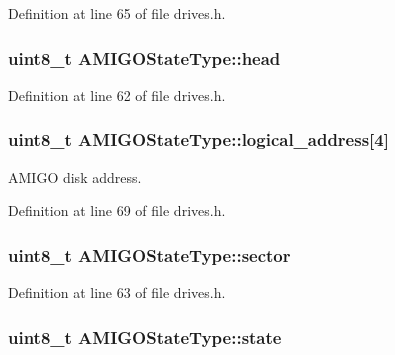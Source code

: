 Definition at line 65 of file drives.\+h.

\subsubsection[{\texorpdfstring{head}{head}}]{\setlength{\rightskip}{0pt plus 5cm}uint8\+\_\+t A\+M\+I\+G\+O\+State\+Type\+::head}\hypertarget{structAMIGOStateType_a92b01a4e3912d2fcacebcc15a21c66c9}{}\label{structAMIGOStateType_a92b01a4e3912d2fcacebcc15a21c66c9}


Definition at line 62 of file drives.\+h.

\subsubsection[{\texorpdfstring{logical\+\_\+address}{logical_address}}]{\setlength{\rightskip}{0pt plus 5cm}uint8\+\_\+t A\+M\+I\+G\+O\+State\+Type\+::logical\+\_\+address\mbox{[}4\mbox{]}}\hypertarget{structAMIGOStateType_a924a685ad68765a91714aa6ad4b20d9f}{}\label{structAMIGOStateType_a924a685ad68765a91714aa6ad4b20d9f}


A\+M\+I\+GO disk address. 



Definition at line 69 of file drives.\+h.

\subsubsection[{\texorpdfstring{sector}{sector}}]{\setlength{\rightskip}{0pt plus 5cm}uint8\+\_\+t A\+M\+I\+G\+O\+State\+Type\+::sector}\hypertarget{structAMIGOStateType_a90615dad99e4fb6852b176bf6712f40b}{}\label{structAMIGOStateType_a90615dad99e4fb6852b176bf6712f40b}


Definition at line 63 of file drives.\+h.

\subsubsection[{\texorpdfstring{state}{state}}]{\setlength{\rightskip}{0pt plus 5cm}uint8\+\_\+t A\+M\+I\+G\+O\+State\+Type\+::state}\hypertarget{structAMIGOStateType_ab3ba7202566a784c93d437960f8f332e}{}\label{structAMIGOStateType_ab3ba7202566a784c93d437960f8f332e}


